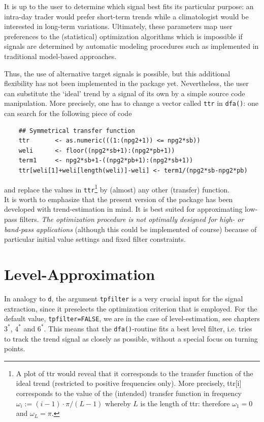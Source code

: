 \documentclass[a4paper]{article}
\begin{document}
It is up to the user to determine which signal best fits its
particular purpose: an intra-day trader would prefer short-term trends
while a climatologist would be interested in long-term variations. 
Ultimately, these parameters map user preferences to the (statistical)
optimization algorithms which is impossible if signals are determined
by automatic modeling procedures such as implemented in traditional
model-based approaches. 

Thus, the use of alternative target signals is possible, but this
additional flexibility has not been implemented in the package yet. 
Nevertheless, the user can substitute the `ideal' trend by a signal of
its own by a simple source code manipulation. More precisely, one has
to change a vector called \texttt{ttr} in \texttt{dfa()}: one can
search for the following piece of code
\begin{verbatim}
    ## Symmetrical transfer function
    ttr       <- as.numeric(((1:(npg2+1)) <= npg2*sb))
    weli      <- floor((npg2*sb+1):(npg2*pb+1))
    term1     <- npg2*sb+1-((npg2*pb+1):(npg2*sb+1))
    ttr[weli[1]+weli[length(weli)]-weli] <- term1/(npg2*sb-npg2*pb)
\end{verbatim}
and replace the values in \texttt{ttr}\footnote{A plot of ttr would
  reveal that it corresponds to the transfer function of the ideal
  trend (restricted to positive frequencies only). More precisely,
  ttr[i] corresponds to the value of the (intended) transfer function
  in frequency $\omega_i:=(i-1) \cdot \pi/(L-1)$ whereby $L$ is the
  length of ttr: therefore $\omega_1=0$ and $\omega_L=\pi$.} by
(almost) any other (transfer) function. \\

It is worth to emphasize that the present version of the package has
been developed with trend-estimation in mind. It is best suited for
approximating low-pass filters. \emph{The optimization procedure is
  not optimally designed for high- or band-pass applications}
(although this could be implemented of course) because of particular
initial value settings and fixed filter constraints. 




\section{Level-Approximation}\label{levapp}

In analogy to \texttt{d}, the argument \texttt{tpfilter} is a very
crucial input for the signal extraction, since it preselects the
optimization criterion that is employed. For the default value,
\texttt{tpfilter=FALSE}, we are in the case of level-estimation, see
chapters $3^*$, $4^*$ and $6^*$. This means that the
\texttt{dfa()}-routine fits a best level filter, i.e.  tries to track
the trend signal as closely as possible, without a special focus on
turning points.\\
\end{document}
